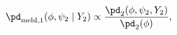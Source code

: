 \begin{equation}
  \pd_{\text{meld}, 1} (\phi, \psi_{2} \mid Y_{2}) \propto
  \frac {
      \pd_{2}(\phi, \psi_{2}, Y_{2})
  } {
      \pd_{2}(\phi)
  },
  \label{eqn:stage_one_target}
\end{equation}